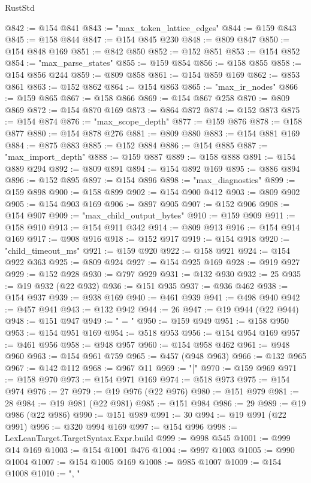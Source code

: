 \begin{lexlean}{RustStd}
\begin{coremodule}
@842 := @154 @841
@843 := "max_token_lattice_edges"
@844 := @159 @843
@845 := @158 @844
@847 := @154 @845 @230
@848 := @809 @847
@850 := @154 @848 @169
@851 := @842 @850
@852 := @152 @851
@853 := @154 @852
@854 := "max_parse_states"
@855 := @159 @854
@856 := @158 @855
@858 := @154 @856 @244
@859 := @809 @858
@861 := @154 @859 @169
@862 := @853 @861
@863 := @152 @862
@864 := @154 @863
@865 := "max_ir_nodes"
@866 := @159 @865
@867 := @158 @866
@869 := @154 @867 @258
@870 := @809 @869
@872 := @154 @870 @169
@873 := @864 @872
@874 := @152 @873
@875 := @154 @874
@876 := "max_scope_depth"
@877 := @159 @876
@878 := @158 @877
@880 := @154 @878 @276
@881 := @809 @880
@883 := @154 @881 @169
@884 := @875 @883
@885 := @152 @884
@886 := @154 @885
@887 := "max_import_depth"
@888 := @159 @887
@889 := @158 @888
@891 := @154 @889 @294
@892 := @809 @891
@894 := @154 @892 @169
@895 := @886 @894
@896 := @152 @895
@897 := @154 @896
@898 := "max_diagnostics"
@899 := @159 @898
@900 := @158 @899
@902 := @154 @900 @412
@903 := @809 @902
@905 := @154 @903 @169
@906 := @897 @905
@907 := @152 @906
@908 := @154 @907
@909 := "max_child_output_bytes"
@910 := @159 @909
@911 := @158 @910
@913 := @154 @911 @342
@914 := @809 @913
@916 := @154 @914 @169
@917 := @908 @916
@918 := @152 @917
@919 := @154 @918
@920 := "child_timeout_ms"
@921 := @159 @920
@922 := @158 @921
@924 := @154 @922 @363
@925 := @809 @924
@927 := @154 @925 @169
@928 := @919 @927
@929 := @152 @928
@930 := @797 @929
@931 := @132 @930
@932 := 25
@935 := @19 @932 (@22 @932)
@936 := @151 @935
@937 := @936 @462
@938 := @154 @937
@939 := @938 @169
@940 := @461 @939
@941 := @498 @940
@942 := @457 @941
@943 := @132 @942
@944 := 26
@947 := @19 @944 (@22 @944)
@948 := @151 @947
@949 := " = "
@950 := @159 @949
@951 := @158 @950
@953 := @154 @951 @169
@954 := @518 @953
@956 := @154 @954 @169
@957 := @461 @956
@958 := @948 @957
@960 := @154 @958 @462
@961 := @948 @960
@963 := @154 @961 @759
@965 := @457 (@948 @963)
@966 := @132 @965
@967 := @142 @112
@968 := @967 @11
@969 := "["
@970 := @159 @969
@971 := @158 @970
@973 := @154 @971 @169
@974 := @518 @973
@975 := @154 @974
@976 := 27
@979 := @19 @976 (@22 @976)
@980 := @151 @979
@981 := 28
@984 := @19 @981 (@22 @981)
@985 := @151 @984
@986 := 29
@989 := @19 @986 (@22 @986)
@990 := @151 @989
@991 := 30
@994 := @19 @991 (@22 @991)
@996 := @320 @994 @169
@997 := @154 @996
@998 := LexLeanTarget.TargetSyntax.Expr.build
@999 := @998 @545
@1001 := @999 @14 @169
@1003 := @154 @1001 @476
@1004 := @997 @1003
@1005 := @990 @1004
@1007 := @154 @1005 @169
@1008 := @985 @1007
@1009 := @154 @1008
@1010 := ", "

\end{coremodule}
\end{lexlean}
